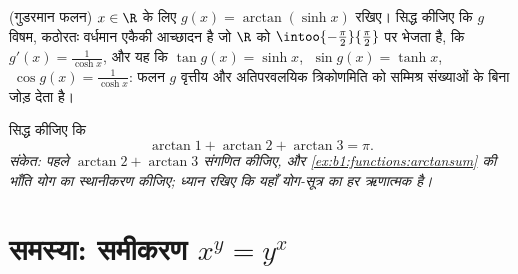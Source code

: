\begin{exercise}[$\star\star\star$]\label{exo:b1:functions:11}
(गुडरमान फलन) $x \in \R$ के लिए $g(x) = \arctan(\sinh x)$ रखिए। सिद्ध कीजिए
कि $g$ विषम, कठोरतः वर्धमान एकैकी आच्छादन है जो $\R$ को
$\intoo{-\frac\pi2}{\frac\pi2}$ पर भेजता है, कि $g'(x) = \frac{1}{\cosh x}$,
और यह कि $\tan g(x) = \sinh x$, $\;\sin g(x) = \tanh x$, $\;\cos g(x) =
\frac{1}{\cosh x}$: फलन $g$ वृत्तीय और अतिपरवलयिक त्रिकोणमिति को सम्मिश्र
संख्याओं के बिना जोड़ देता है।
\end{exercise}

\begin{exercise}[$\star\star$]\label{exo:b1:functions:12}
सिद्ध कीजिए कि
\[
\arctan 1 + \arctan 2 + \arctan 3 = \pi .
\]
\emph{संकेत: पहले $\arctan 2 + \arctan 3$ संगणित कीजिए, और
\cref{ex:b1:functions:arctansum} की भाँति योग का स्थानीकरण कीजिए; ध्यान रखिए
कि यहाँ योग-सूत्र का हर ऋणात्मक है।}
\end{exercise}

\section{समस्या: समीकरण $x^y = y^x$}

